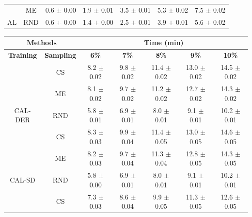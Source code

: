\begin{table}[htbp]
\begin{tabular*}{\linewidth}{c|c|@{\extracolsep{\fill}}ccccc}
 & ME & 0.6 $\pm$ {\small 0.00} & 1.9 $\pm$ {\small 0.01} & 3.5 $\pm$ {\small 0.01} & 5.3 $\pm$ {\small 0.02} & 7.5 $\pm$ {\small 0.02}\\

\multirow{-3}{*}{\raggedright\arraybackslash AL} & RND & 0.6 $\pm$ {\small 0.00} & 1.4 $\pm$ {\small 0.00} & 2.5 $\pm$ {\small 0.01} & 3.9 $\pm$ {\small 0.01} & 5.6 $\pm$ {\small 0.02}\\
\bottomrule
\end{tabular*}
\vspace{0.5em}

\begin{tabular*}{\linewidth}{c|c|@{\extracolsep{\fill}}ccccc}
\toprule
\multicolumn{2}{c|}{\textbf{Methods}} & \multicolumn{5}{c}{\textbf{Time (min)}} \\
\midrule
\textbf{Training} & \textbf{Sampling} & \textbf{6\%} & \textbf{7\%} & \textbf{8\%} & \textbf{9\%} & \textbf{10\%}\\
\midrule
 & CS & 8.2 $\pm$ {\small 0.02} & 9.8 $\pm$ {\small 0.02} & 11.4 $\pm$ {\small 0.02} & 13.0 $\pm$ {\small 0.02} & 14.5 $\pm$ {\small 0.02}\\

 & ME & 8.1 $\pm$ {\small 0.02} & 9.7 $\pm$ {\small 0.02} & 11.2 $\pm$ {\small 0.02} & 12.7 $\pm$ {\small 0.02} & 14.3 $\pm$ {\small 0.02}\\

\multirow{-3}{*}{\raggedright\arraybackslash CAL-DER} & RND & 5.8 $\pm$ {\small 0.01} & 6.9 $\pm$ {\small 0.01} & 8.0 $\pm$ {\small 0.01} & 9.1 $\pm$ {\small 0.01} & 10.2 $\pm$ {\small 0.01}\\
\midrule
 & CS & 8.3 $\pm$ {\small 0.03} & 9.9 $\pm$ {\small 0.04} & 11.4 $\pm$ {\small 0.05} & 13.0 $\pm$ {\small 0.05} & 14.6 $\pm$ {\small 0.05}\\

 & ME & 8.2 $\pm$ {\small 0.03} & 9.7 $\pm$ {\small 0.04} & 11.3 $\pm$ {\small 0.04} & 12.8 $\pm$ {\small 0.05} & 14.3 $\pm$ {\small 0.05}\\

\multirow{-3}{*}{\raggedright\arraybackslash CAL-SD} & RND & 5.8 $\pm$ {\small 0.00} & 6.9 $\pm$ {\small 0.01} & 8.0 $\pm$ {\small 0.01} & 9.1 $\pm$ {\small 0.01} & 10.2 $\pm$ {\small 0.01}\\
\midrule
 & CS & 7.3 $\pm$ {\small 0.03} & 8.6 $\pm$ {\small 0.04} & 9.9 $\pm$ {\small 0.05} & 11.3 $\pm$ {\small 0.05} & 12.6 $\pm$ {\small 0.05}\\


\end{tabular*}
\end{table}
